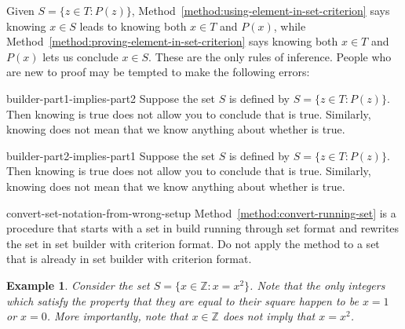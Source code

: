 \documentclass{book}
\newcounter{ekcounter}%
\theoremstyle{ekimcustom}
\newtheorem{example}[ekcounter]{Example}
\begin{document}
Given $S = \{z \in T : P(z)\}$, Method~\ref{method:using-element-in-set-criterion} says knowing $x \in S$ leads to knowing both $x \in T$ and $P(x)$, while Method~\ref{method:proving-element-in-set-criterion} says knowing both $x \in T$ and $P(x)$ lets us conclude $x \in S$. These are the only rules of inference. People who are new to proof may be tempted to make the following errors:
\begin{bwarning}{}{builder-part1-implies-part2}
Suppose the set $S$ is defined by $S = \{z \in T : P(z)\}$. Then knowing  is true does not allow you to conclude that  is true. Similarly, knowing  does not mean that we know anything about whether  is true.
\end{bwarning}
\begin{bwarning}{}{builder-part2-implies-part1}
Suppose the set $S$ is defined by $S = \{z \in T : P(z)\}$. Then knowing  is true does not allow you to conclude that  is true.  Similarly, knowing  does not mean that we know anything about whether  is true.
\end{bwarning}

\begin{bwarning}{}{convert-set-notation-from-wrong-setup}
Method~\ref{method:convert-running-set} is a procedure that starts with a set in build running through set format and rewrites the set in set builder with criterion format. Do not apply the method to a set that is already in set builder with criterion format.
\end{bwarning}

\begin{example}
Consider the set $S = \{x \in \mathbb{Z} : x = x^2\}$. Note that the only integers which satisfy the property that they are equal to their square happen to be $x=1$ or $x=0$. More importantly, note that $x \in \mathbb{Z}$ does not imply that $x=x^2$.
\end{example}
\end{document}

